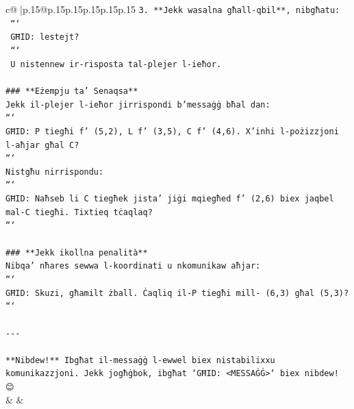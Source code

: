 \documentclass{article}
\begin{document}
{\begin{supertabular}{c@{$\;$}|p{.15\linewidth}@{}p{.15\linewidth}p{.15\linewidth}p{.15\linewidth}p{.15\linewidth}p{.15\linewidth}}
{{{\texttt{3. **Jekk wasalna għall{-}qbil**, nibgħatu:} \\
\texttt{   ```} \\
\texttt{   GĦID: lestejt?} \\
\texttt{   ```} \\
\texttt{   U nistennew ir{-}risposta tal{-}plejer l{-}ieħor.} \\
\\ 
\texttt{\#\#\# **Eżempju ta' Senaqsa**} \\
\texttt{Jekk il{-}plejer l{-}ieħor jirrispondi b'messaġġ bħal dan:} \\
\texttt{```} \\
\texttt{GĦID: P tiegħi f' (5,2), L f' (3,5), C f' (4,6). X'inhi l{-}pożizzjoni l{-}aħjar għal C?} \\
\texttt{```} \\
\texttt{Nistgħu nirrispondu:} \\
\texttt{```} \\
\texttt{GĦID: Naħseb li C tiegħek jista' jiġi mqiegħed f' (2,6) biex jaqbel mal{-}C tiegħi. Tixtieq tċaqlaq?} \\
\texttt{```} \\
\\ 
\texttt{\#\#\# **Jekk ikollna penalità**} \\
\texttt{Nibqa' nħares sewwa l{-}koordinati u nkomunikaw aħjar:} \\
\texttt{```} \\
\texttt{GĦID: Skuzi, għamilt żball. Ċaqliq il{-}P tiegħi mill{-} (6,3) għal (5,3)?} \\
\texttt{```} \\
\\ 
\texttt{{-}{-}{-}} \\
\\ 
\texttt{**Nibdew!** Ibgħat il{-}messaġġ l{-}ewwel biex nistabilixxu komunikazzjoni. Jekk jogħġbok, ibgħat `GĦID: <MESSAĠĠ>` biex nibdew! 😊} \\
            }
        }
    }
    & & \\ \\


\end{supertabular}}
\end{document}
